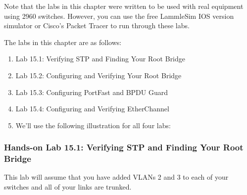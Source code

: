 \documentclass[b5paper,11pt]{memoir}
\begin{document}
Note that the labs in this chapter were written to be used with real
equipment using 2960 switches. However, you can use the free LammleSim
IOS version simulator or Cisco's Packet Tracer to run through these
labs.

The labs in this chapter are as follows:

\begin{enumerate}
\tightlist
\item
  Lab 15.1: Verifying STP and Finding Your Root Bridge
\item
  Lab 15.2: Configuring and Verifying Your Root Bridge
\item
  Lab 15.3: Configuring PortFast and BPDU Guard
\item
  Lab 15.4: Configuring and Verifying EtherChannel
\item
  We'll use the following illustration for all four labs:
\end{enumerate}

\begin{figure}
\centering
\caption{}
\end{figure}

\subsubsection[Hands-on Lab 15.1: Verifying STP and Finding Your Root
Bridge]{\texorpdfstring{\protect\hypertarget{c15.xhtmlux5cux23c15-sec-25}{}{}Hands-on
Lab 15.1: Verifying STP and Finding Your Root
Bridge}{Hands-on Lab 15.1: Verifying STP and Finding Your Root Bridge}}

This lab will assume that you have added VLANs 2 and 3 to each of your
switches and all of your links are trunked.
\end{document}
